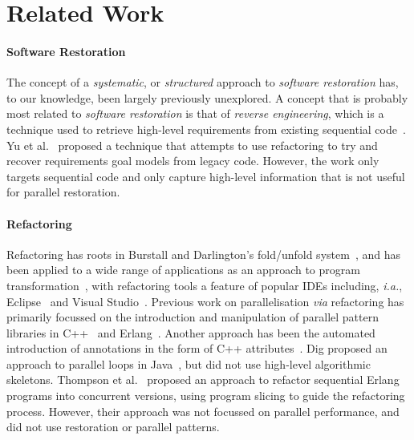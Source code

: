 \section{Related Work}

\paragraph{Software Restoration}

The concept of a \emph{systematic}, or \emph{structured} approach to \emph{software restoration} has, to our knowledge, been largely previously unexplored. A concept that is probably most related to \emph{software restoration} is that of \emph{reverse engineering}, which is a technique used to retrieve high-level requirements from existing sequential code~\cite{10.1145/287000.287001}\cite{10.1145/337180.337234}. Yu et al.~\cite{10.1109/RE.2005.61} proposed a technique that attempts to use refactoring to try and recover requirements goal models from legacy code. However, the work only targets sequential code and only capture high-level information that is not useful for parallel restoration.

\paragraph{Refactoring}
Refactoring has roots in Burstall and Darlington's fold/unfold system~\cite{darlington77}, and has been applied to a wide range of applications as an approach to program transformation~\cite{mens_refactoring}, with refactoring tools a feature of popular IDEs including, \textit{i.a.}, Eclipse~\cite{EclipseWeb} and Visual Studio~\cite{VisualStudioWeb}.
Previous work on parallelisation \textit{via} refactoring has primarily focussed on the introduction and manipulation of parallel pattern libraries in C++~\cite{brownagricultural,DBLP:conf/pdp/JanjicBMHDAG16} and Erlang~\cite{hlpp,DBLP:journals/cai/BarwellBHTB16}. Another approach
has been the automated introduction of annotations in the form of
C++ attributes~\cite{rio:2018}. Dig proposed an approach to parallel loops in Java~\cite{dig}, but did not use high-level algorithmic skeletons. Thompson et al.~\cite{10.1145/2678015.2682533} proposed an approach to refactor sequential Erlang programs into concurrent versions, using program slicing to guide the refactoring process. However, their approach was not focussed on parallel performance, and did not use restoration or parallel patterns.  

